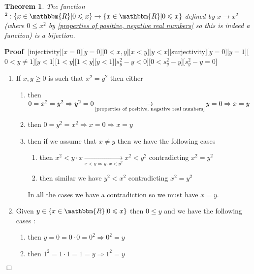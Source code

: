 \documentclass{book}
\newcommand{\Rightarrowlim}{\mathop{\rightarrow}\limits}
\newenvironment{proof}{\noindent\textbf{Proof\ }}{\hspace*{\fill}$\Box$\medskip}
\newtheorem{theorem}{Theorem}
\begin{document}
{{\begin{theorem}
  The function $^2 : \{ x \in \mathbbm{R}|0 \leqslant x \} \rightarrow \{ x
  \in \mathbbm{R}|0 \leqslant x \}$ defined by $x \rightarrow x^2$ (where $0
  \leqslant x^2$ by \ref{properties of positive, negative real numbers} so
  this is indeed a function) is a bijection.
\end{theorem}

\begin{proof}[injectivity][$x = 0$][$y = 0$][$0 < x, y$][$x < y$][$y <
x$][surjectivity][$y = 0$][$y = 1$][$0 < y \neq 1$][$y < 1$][$1 < y$][$1 <
y$][$y < 1$][$s_y^2 - y < 0$][$0 < s_y^2 - y$][$s_y^2 - y = 0$]
  
  \begin{enumerate}
    \item If $x, y \geqslant 0$ is such that $x^2 = y^2$ then either
    \begin{enumerate}
      \item then $0 = x^2 = y^2 \Rightarrow y^2 = 0
      \Rightarrowlim_{\text{\ref{properties of positive, negative real
      numbers}}} y = 0 \Rightarrow x = y$
      
      \item then $0 = y^2 = x^2 \Rightarrow x = 0 \Rightarrow x = y$
      
      \item then if we assume that $x \neq y$ then we have the following cases
      \begin{enumerate}
        \item then $x^2 < y \cdot x \Rightarrowlim_{x < y \Rightarrow y \cdot
        x < y^2} x^2 < y^2$ contradicting $x^2 = y^2$
        
        \item then similar we have $y^2 < x^2$ contradicting $x^2 = y^2$
      \end{enumerate}
      In all the cases we have a contradiction so we must have $x = y$.
    \end{enumerate}
    \item Given $y \in \{ x \in \mathbbm{R}|0 \leqslant x \}$ then $0
    \leqslant y$ and we have the following cases :
    \begin{enumerate}
      \item then $y = 0 = 0 \cdot 0 = 0^2 \Rightarrow 0^2 = y$
      
      \item then $1^2 = 1 \cdot 1 = 1 = y \Rightarrow 1^2 = y$
      

\end{enumerate}
\end{enumerate}
\end{proof}}}
\end{document}
